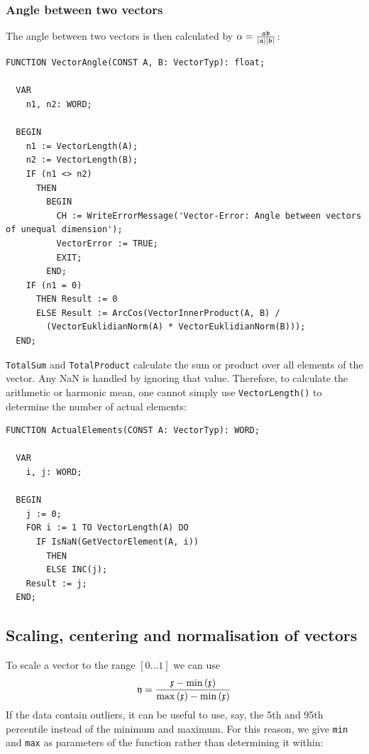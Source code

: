 \begin{refsection}
\subsubsection{Angle between two vectors}

The angle between two vectors is then calculated by \(\alpha = \frac{\mathfrak{ab}}{|\mathfrak{a}| |\mathfrak{b}|} \):

\begin{lstlisting}[caption=Angle between vectors]
  FUNCTION VectorAngle(CONST A, B: VectorTyp): float;

  VAR
    n1, n2: WORD;

  BEGIN
    n1 := VectorLength(A);
    n2 := VectorLength(B);
    IF (n1 <> n2)
      THEN
        BEGIN
          CH := WriteErrorMessage('Vector-Error: Angle between vectors of unequal dimension');
          VectorError := TRUE;
          EXIT;
        END;
    IF (n1 = 0)
      THEN Result := 0
      ELSE Result := ArcCos(VectorInnerProduct(A, B) /
        (VectorEuklidianNorm(A) * VectorEuklidianNorm(B)));
  END;
\end{lstlisting}

\texttt{TotalSum} and \texttt{TotalProduct} calculate the sum or product over all elements of the vector. Any \acs{NaN} is handled by ignoring that value. Therefore, to calculate the arithmetic or harmonic mean, one cannot simply use \texttt{VectorLength()} to determine the number of actual elements:

\begin{lstlisting}[caption=Number of non-NaN elements]
  FUNCTION ActualElements(CONST A: VectorTyp): WORD;

  VAR
    i, j: WORD;

  BEGIN
    j := 0;
    FOR i := 1 TO VectorLength(A) DO
      IF IsNaN(GetVectorElement(A, i))
        THEN
        ELSE INC(j);
    Result := j;
  END;
\end{lstlisting}


\subsection{Scaling, centering and normalisation of vectors}

To scale a vector to the range \([0\ldots 1] \) we can use
\begin{equation}
  \mathfrak{y} = \frac{\mathfrak{x} - \min{(\ensuremath{\mathfrak{x}})}}{\max{(\ensuremath{\mathfrak{x}})} - \min{(\ensuremath{\mathfrak{x}})}}
\end{equation}
If the data contain outliers, it can be useful to use, say, the 5th and 95th percentile instead of the minimum and maximum. For this reason, we give \texttt{min} and \texttt{max} as parameters of the function rather than determining it within:


\end{refsection}
